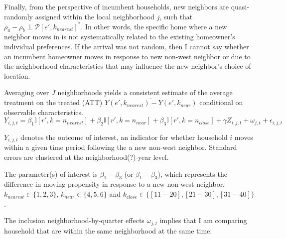 \documentclass[../main.tex]{subfiles}
\begin{document}
Finally, from the perspective of incumbent households, new neighbors are quasi-randomly assigned within the local neighborhood $j$, such that $\rho_a - \rho_b \perp \mathcal{P}[e', k_{nearest}]^*$. In other words, the specific home where a new neighbor moves in is not systematically related to the existing homeowner's individual preferences. If the arrival was not random, then I cannot say whether an incumbent homeowner moves in response to new non-west neighbor or due to the neighborhood characteristics that may influence the new neighbor's choice of location. 

Averaging over $J$ neighborhoods yields a consistent estimate of the average treatment on the treated (ATT) $\overline{Y(e', k_{nearest}) - Y(e', k_{near})}$ conditional on observable characteristics. 
\begin{equation}
    Y_{i, j, t} = \beta_1 \mathbb{I}[r', k=n_{nearest}] + \beta_2 \mathbb{I}[r', k = n_{near}] + \beta_3 \mathbb{I}[r', k = n_{close}]  + \gamma Z_{i, j, t} + \omega_{j, t} + \epsilon_{i, j, t}
    \label{eq:main_eq_schelling_behavior}
\end{equation}

$Y_{i, j, t}$ denotes the outcome of interest, an indicator for whether household $i$ moves within a given time period following the a new non-west neighbor. Standard errors are clustered at the neighborhood(?)-year level.

The parameter(s) of interest is $\beta_1 - \beta_3$ (or $\beta_1 - \beta_3$), which represents the difference in moving propensity in response to a new non-west neighbor. $k_{nearest} \in \{1, 2, 3\}$, $k_{near} \in \{4, 5, 6\}$ and $k_{close} \in \{[11-20], [21-30], [31-40]\}$.

The inclusion neighborhood-by-quarter effects $\omega_{j,t}$ implies that I am comparing household that are within the same neighborhood at the same time. 
\end{document}
